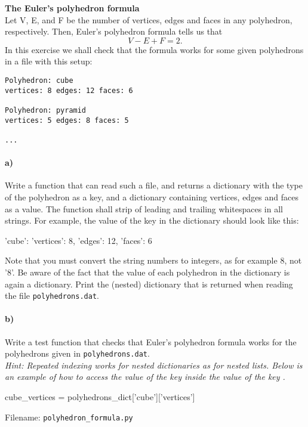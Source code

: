 \begin{Problem}{\textbf{The Euler's polyhedron formula}}
\noindent 
\\Let V, E, and F be the number of vertices, edges and faces in any polyhedron, respectively. Then, Euler's polyhedron formula tells us that
$$
V-E+F=2.
$$
In this exercise we shall check that the formula works for some given polyhedrons in a file with this setup:
\begin{lstlisting}
Polyhedron: cube
vertices: 8 edges: 12 faces: 6

Polyhedron: pyramid
vertices: 5 edges: 8 faces: 5

...
\end{lstlisting}

\paragraph{a)}
Write a function that can read such a file, and returns a dictionary with the type of the polyhedron as a key, and a dictionary containing vertices, edges and faces as a value. The function shall strip of leading and trailing whitespaces in all strings. For example, the value of the key  in the dictionary should look like this:
\begin{python}
'cube': {'vertices': 8, 'edges': 12, 'faces': 6}
\end{python}
Note that you must convert the string numbers to integers, as for example $8$, not '$8$'. Be aware of the fact that the value of each polyhedron in the dictionary is again a dictionary. Print the (nested) dictionary that is returned when reading the file \texttt{polyhedrons.dat}.
\paragraph{b)}
Write a test function  that checks that Euler's polyhedron formula works for the polyhedrons given in \texttt{polyhedrons.dat}.\\
\noindent
\emph{Hint: Repeated indexing works for nested dictionaries as for nested lists. Below is an example of how to access the value of the key  inside the value of the key .}
\begin{python}
cube_vertices = polyhedrons_dict['cube']['vertices']
\end{python}

Filename: \texttt{polyhedron\_formula.py}

\end{Problem}
\newpage

